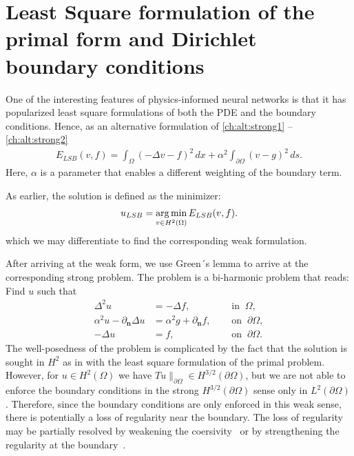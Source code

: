 \section{Least Square formulation of the primal form and Dirichlet boundary conditions}

One of the interesting features of physics-informed neural networks is that it has popularized 
least square formulations of both the PDE and the boundary conditions. Hence, as
an alternative formulation of \eqref{ch:alt:strong1} -- \eqref{ch:alt:strong2}   
\begin{align}
E_{LSB}(v, f) = \int_\Omega (-\Delta v - f)^2 \, dx + \alpha^2 \int_{\partial \Omega} (v - g)^2 \, ds .  
\end{align}
Here, $\alpha$ is a parameter that enables a different weighting of the boundary term.  

As earlier, the solution is defined as the minimizer: 
\begin{align}
\label{ch:alt:lsb}
u_{LSB} = \operatorname*{arg\,min}_{v \in H^2(\Omega)} E_{LSB} (v, f) .   
\end{align}
which we may differentiate to find the corresponding weak formulation. 

After arriving at the weak form, we use Green´s lemma to arrive at the 
corresponding strong problem. The problem is a bi-harmonic problem that reads: 
Find $u$ such that 
\newcommand{\partialn}{\partial_{\mathbf{n}}}
\begin{align}
\label{L1strong1Alt}
\Delta^2 u &= -\Delta f, \quad &\mbox{ in } \ \Omega, \\
\label{L1strong2Alt}
         \alpha^2 u - \partialn \Delta u &= \alpha^2 g + \partialn f, \quad &\mbox{ on } \ \partial \Omega, \\
\label{L1strong3Alt}
         -\Delta u &= f, \quad &\mbox{ on } \ \partial \Omega. 
\end{align}
The well-posedness of the problem is complicated by the fact that the solution is sought in $H^2$ 
as in with the least square formulation of the primal problem.  
However, for $u \in H^2(\Omega)$ we have  $T u \|_{\partial \Omega} \in H^{3/2}(\partial \Omega)$, but
we are not able to enforce the boundary conditions in the strong $H^{3/2}(\partial \Omega)$ sense
only in  $L^{2}(\partial \Omega)$. Therefore, since the boundary conditions are only enforced in this
weak sense, there is potentially a loss of regularity near the boundary. The 
loss of regularity may be partially resolved by weakening the coersivity~\cite{zeinhofer2024unified} 
or by strengthening the regularity at the boundary~\cite{bonito2025convergence}.  





